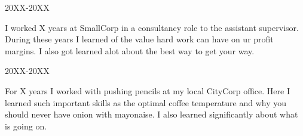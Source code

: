 





\begin{timeline}
	\item \subtitle{SmallCorp}
	\hfill 20XX-20XX

	{\small I worked X years at SmallCorp in a consultancy role to the assistant supervisor. During these years I learned of the value hard work can have on ur profit margins. I also got learned alot about the best way to get your way.}

	\item \subtitle{CityCorp}
	\hfill 20XX-20XX

	{\small For X years I worked with pushing pencils at my local CityCorp office. Here I learned such important skills as the optimal coffee temperature and why you should never have onion with mayonaise. I also learned significantly about what is going on.}

\end{timeline}
